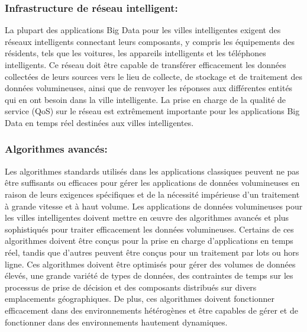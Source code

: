 \documentclass[french, a4paper, 12pt]{report}
\begin{document}
\subsubsection{Infrastructure de réseau intelligent:}

La plupart des applications Big Data pour les villes intelligentes exigent des réseaux intelligents connectant leurs composants, y compris les équipements des résidents, tels que les voitures, les appareils intelligents et les téléphones intelligents. Ce réseau doit être capable de transférer efficacement les données collectées de leurs sources vers le lieu de collecte, de stockage et de traitement des données volumineuses, ainsi que de renvoyer les réponses aux différentes entités qui en ont besoin dans la ville intelligente. La prise en charge de la qualité de service (QoS) sur le réseau est extrêmement importante pour les applications Big Data en temps réel destinées aux villes intelligentes. \\
\subsubsection{Algorithmes avancés:}
Les algorithmes standards utilisés dans les applications classiques peuvent ne pas être suffisants ou efficaces pour gérer les applications de données volumineuses en raison de leurs exigences spécifiques et de la nécessité impérieuse d'un traitement à grande vitesse et à haut volume. Les applications de données volumineuses pour les villes intelligentes doivent mettre en œuvre des algorithmes avancés et plus sophistiqués pour traiter efficacement les données volumineuses. Certains de ces algorithmes doivent être conçus pour la prise en charge d'applications en temps réel, tandis que d'autres peuvent être conçus pour un traitement par lots ou hors ligne. Ces algorithmes doivent être optimisés pour gérer des volumes de données élevés, une grande variété de types de données, des contraintes de temps sur les processus de prise de décision et des composants distribués sur divers emplacements géographiques. De plus, ces algorithmes doivent fonctionner efficacement dans des environnements hétérogènes et être capables de gérer et de fonctionner dans des environnements hautement dynamiques.\\
\end{document}
